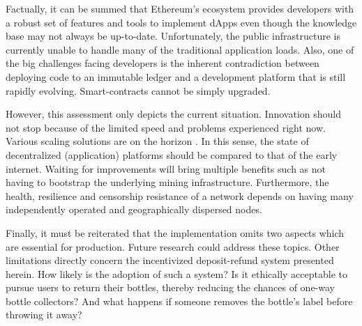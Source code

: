 
Factually, it can be summed that Ethereum's ecosystem provides developers with a robust set of features and tools to implement \acp{dApp} even though the knowledge base may not always be up-to-date. Unfortunately, the public infrastructure is currently unable to handle many of the traditional application loads. Also, one of the big challenges facing developers is the inherent contradiction between deploying code to an immutable ledger and a development platform that is still rapidly evolving. Smart-contracts cannot be simply upgraded. 

However, this assessment only depicts the current situation. Innovation should not stop because of the limited speed and problems experienced right now. Various scaling solutions are on the horizon \cite{scalingEthereum}. In this sense, the state of decentralized (application) platforms should be compared to that of the early internet. Waiting for improvements will bring multiple benefits such as not having to bootstrap the underlying mining infrastructure. Furthermore, the health, resilience and censorship resistance of a network depends on having many independently operated and geographically dispersed nodes.

Finally, it must be reiterated that the implementation omits two aspects which are essential for production. Future research could address these topics. Other limitations directly concern the incentivized deposit-refund system presented herein. How likely is the adoption of such a system? Is it ethically acceptable to pursue users to return their bottles, thereby reducing the chances of one-way bottle collectors? And what happens if someone removes the bottle's label before throwing it away?  



